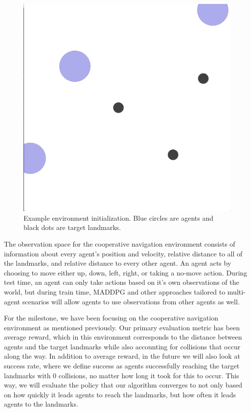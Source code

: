 \documentclass{article}
\begin{document}
\begin{figure}
\begin{center}
\includegraphics[scale=0.15]{env-image}
\end{center}
\caption{Example environment initialization. Blue circles are agents and black dots are target landmarks.}
\end{figure}

The observation space for the cooperative navigation environment consists of information about every agent's position and velocity, relative distance to all of the landmarks, and relative distance to every other agent. An agent acts by choosing to move either up, down, left, right, or taking a no-move action. During test time, an agent can only take actions based on it's own observations of the world, but during train time, MADDPG and other approaches tailored to multi-agent scenarios will allow agents to use observations from other agents as well.

For the milestone, we have been focusing on the cooperative navigation environment as mentioned previously. Our primary evaluation metric has been average reward, which in this environment corresponds to the distance between agents and the target landmarks while also accounting for collisions that occur along the way. In addition to average reward, in the future we will also look at success rate, where we define success as agents successfully reaching the target landmarks with 0 collisions, no matter how long it took for this to occur. This way, we will evaluate the policy that our algorithm converges to not only based on how quickly it leads agents to reach the landmarks, but how often it leads agents to the landmarks.
\end{document}
